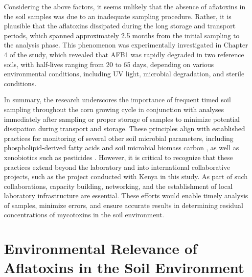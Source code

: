 Considering the above factors, it seems unlikely that the absence of aflatoxins in the soil samples was due to an inadequate sampling procedure. Rather, it is plausible that the aflatoxins dissipated during the long storage and transport periods, which spanned approximately 2.5 months from the initial sampling to the analysis phase. This phenomenon was experimentally investigated in Chapter 4 of the study, which revealed that AFB1 was rapidly degraded in two reference soils, with half-lives ranging from 20 to 65 days, depending on various environmental conditions, including UV light, microbial degradation, and sterile conditions.


In summary, the research underscores the importance of frequent timed soil sampling throughout the corn growing cycle in conjunction with analyses immediately after sampling or proper storage of samples to minimize potential dissipation during transport and storage. These principles align with established practices for monitoring of several other soil microbial parameters, including phospholipid-derived fatty acids \citep{petersen1994effects, veum2019phospholipid} and soil microbial biomass carbon \citep{vcernohlavkova2009variability, stenberg1998microbial}, as well as xenobiotics such as pesticides \citep{lehotay2015sampling}. However, it is critical to recognize that these practices extend beyond the laboratory and into international collaborative projects, such as the project conducted with Kenya in this study. As part of such collaborations, capacity building, networking, and the establishment of local laboratory infrastructure are essential. These efforts would enable timely analysis of samples, minimize errors, and ensure accurate results in determining residual concentrations of mycotoxins in the soil environment. 

\section{Environmental Relevance of Aflatoxins in the Soil Environment}

